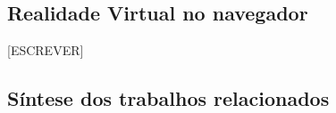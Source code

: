 \subsection{Realidade Virtual no navegador}

[ESCREVER]

\subsection{Síntese dos trabalhos relacionados}


